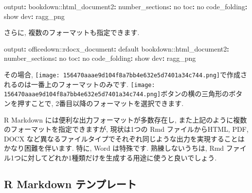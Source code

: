 \documentclass[
]{ltjsarticle}
\newenvironment{Shaded}{\begin{snugshade}}{\end{snugshade}}
\newcommand{\AttributeTok}[1]{\textcolor[rgb]{0.77,0.63,0.00}{#1}}
\newcommand{\CharTok}[1]{\textcolor[rgb]{0.31,0.60,0.02}{#1}}
\newcommand{\FunctionTok}[1]{\textcolor[rgb]{0.00,0.00,0.00}{#1}}
\newcommand{\KeywordTok}[1]{\textcolor[rgb]{0.13,0.29,0.53}{\textbf{#1}}}
\newenvironment{infobox}[1]{\begin{itemize}\renewcommand{\labelitemi}{\raisebox{-.7\height}[0pt][0pt]{%
  {\setkeys{Gin}{width=3em,keepaspectratio}\texttt{[image: \_latex/\_img/\#1]}}}}
  \setlength{\fboxsep}{1em}
  \begin{greyblock}
  \item
  }{\end{greyblock}\end{itemize}
}
\begin{document}
\begin{Shaded}
\begin{Highlighting}[]
\FunctionTok{output}\KeywordTok{:}
\AttributeTok{  bookdown:}\FunctionTok{:html\_document2}\KeywordTok{:}
\AttributeTok{    }\FunctionTok{number\_sections}\KeywordTok{:}\AttributeTok{ }\CharTok{no}
\AttributeTok{    }\FunctionTok{toc}\KeywordTok{:}\AttributeTok{ }\CharTok{no}
\AttributeTok{    }\FunctionTok{code\_folding}\KeywordTok{:}\AttributeTok{ show}
\AttributeTok{    }\FunctionTok{dev}\KeywordTok{:}\AttributeTok{ ragg\_png}
\end{Highlighting}
\end{Shaded}

さらに, 複数のフォーマットも指定できます.

\begin{Shaded}
\begin{Highlighting}[]
\FunctionTok{output}\KeywordTok{:}
\AttributeTok{  officedown:}\FunctionTok{:rdocx\_document}\KeywordTok{:}\AttributeTok{ default}
\AttributeTok{  bookdown:}\FunctionTok{:html\_document2}\KeywordTok{:}
\AttributeTok{    }\FunctionTok{number\_sections}\KeywordTok{:}\AttributeTok{ }\CharTok{no}
\AttributeTok{    }\FunctionTok{toc}\KeywordTok{:}\AttributeTok{ }\CharTok{no}
\AttributeTok{    }\FunctionTok{code\_folding}\KeywordTok{:}\AttributeTok{ show}
\AttributeTok{    }\FunctionTok{dev}\KeywordTok{:}\AttributeTok{ ragg\_png}
\end{Highlighting}
\end{Shaded}

その場合, \texttt{[image: 156470aaae9d104f8a7bb4e632e5d7401a34c744.png]}で作成されるのは一番上のフォーマットのみです. \texttt{[image: 156470aaae9d104f8a7bb4e632e5d7401a34c744.png]}ボタンの横の三角形のボタンを押すことで, 2番目以降のフォーマットを選択できます.

\begin{infobox}{important}
R Markdown には便利な出力フォーマットが多数存在し, また上記のように複数のフォーマットを指定できますが, 現状は1つの Rmd ファイルからHTML, PDF, DOCX など異なるファイルタイプでそれぞれ同じような出力を実現することはかなり困難を伴います. 特に, Word は特殊です. 熟練しないうちは, Rmd ファイル1つに対してどれか1種類だけを生成する用途に使うと良いでしょう.

\end{infobox}

\hypertarget{r-markdown-ux30c6ux30f3ux30d7ux30ecux30fcux30c8}{%
\subsection{R Markdown テンプレート}\label{r-markdown-ux30c6ux30f3ux30d7ux30ecux30fcux30c8}}
\end{document}
